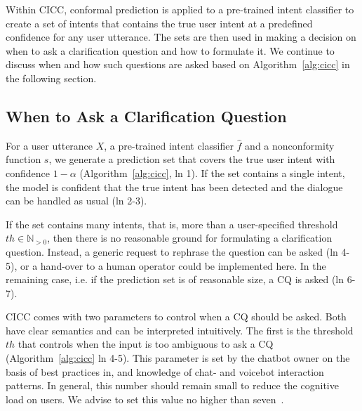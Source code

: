 \documentclass[11pt]{article}
\begin{document}
Within CICC, conformal prediction is applied to a pre-trained intent classifier to create a set of intents that contains the true user intent at a predefined confidence for any user utterance. The sets are then used in making a decision on when to ask a clarification question and how to formulate it. We continue to discuss when and how such questions are asked based on Algorithm~\ref{alg:cicc} in the following section.




\subsection{When to Ask a Clarification Question}
For a user utterance $X$, a pre-trained intent classifier $\hat{f}$ and a nonconformity function $s$, we generate a prediction set that covers the true user intent with confidence $1-\alpha$ (Algorithm~\ref{alg:cicc}, ln 1). If the set contains a single intent, the model is confident that the true intent has been detected and the dialogue can be handled as usual (ln 2-3).

If the set contains many intents, that is, more than a user-specified threshold $th \in \mathbb{N}_{>0}$, then there is no reasonable ground for formulating a clarification question. Instead, a generic request to rephrase the question can be asked (ln 4-5), or a hand-over to a human operator could be implemented here. In the remaining case, i.e. if the prediction set is of reasonable size, a CQ is asked (ln 6-7).

CICC comes with two parameters to control when a CQ should be asked. Both have clear semantics and can be interpreted intuitively. The first is the threshold $th$ that controls when the input is too ambiguous to ask a CQ (Algorithm~\ref{alg:cicc} ln 4-5). This parameter is set by the chatbot owner on the basis of best practices in, and knowledge of chat- and voicebot interaction patterns. In general, this number should remain small to reduce the cognitive load on users. We advise to set this value no higher than seven~\cite{miller1956magical,plass2010cognitive}.
\end{document}
